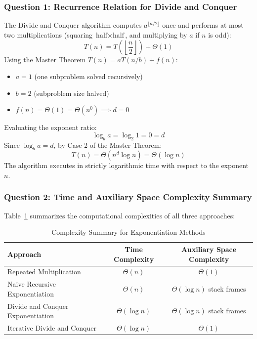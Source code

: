 \documentclass[12pt]{article}
\begin{document}
\subsubsection{Question 1: Recurrence Relation for Divide and Conquer}
The Divide and Conquer algorithm computes $a^{\lfloor n/2 \rfloor}$ once and performs at most two multiplications (squaring $\text{half} \times \text{half}$, and multiplying by $a$ if $n$ is odd):
\begin{equation}
    T(n) = T\left(\left\lfloor \frac{n}{2} \right\rfloor\right) + \Theta(1)
\end{equation}
Using the Master Theorem $T(n) = aT(n/b) + f(n)$:
\begin{itemize}
    \item $a = 1$ (one subproblem solved recursively)
    \item $b = 2$ (subproblem size halved)
    \item $f(n) = \Theta(1) = \Theta(n^0) \implies d = 0$
\end{itemize}
Evaluating the exponent ratio:
\begin{equation}
    \log_b a = \log_2 1 = 0 = d
\end{equation}
Since $\log_b a = d$, by Case 2 of the Master Theorem:
\begin{equation}
    T(n) = \Theta(n^d \log n) = \Theta(\log n)
\end{equation}
The algorithm executes in strictly logarithmic time with respect to the exponent $n$.

\subsubsection{Question 2: Time and Auxiliary Space Complexity Summary}
Table~\ref{tab:comp_p2} summarizes the computational complexities of all three approaches:

\begin{table}[H]
\centering
\caption{Complexity Summary for Exponentiation Methods}
\label{tab:comp_p2}
\vspace{0.2cm}
\begin{tabular}{lcc}
\toprule
\textbf{Approach} & \textbf{Time Complexity} & \textbf{Auxiliary Space Complexity} \\
\midrule
Repeated Multiplication & $\Theta(n)$ & $\Theta(1)$ \\
Naive Recursive Exponentiation & $\Theta(n)$ & $\Theta(\log n)$ stack frames \\
Divide and Conquer Exponentiation & $\Theta(\log n)$ & $\Theta(\log n)$ stack frames \\
Iterative Divide and Conquer & $\Theta(\log n)$ & $\Theta(1)$ \\
\bottomrule
\end{tabular}
\end{table}
\end{document}
